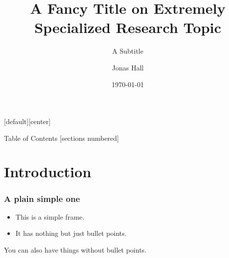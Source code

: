 \documentclass[10pt,xcolor=table]{beamer}
\title{A Fancy Title on Extremely Specialized Research Topic}
\subtitle{A Subtitle}
\date{\today}
\author{Jonas Hall}
\begin{document}
{
\maketitle
}

[default][center]

\begin{frame}[plain]{Table of Contents}
  [sections numbered]
  \tableofcontents[hideallsubsections]
\end{frame}

\section{Introduction}
\begin{frame}
  \frametitle{A plain simple one}
  \begin{itemize}
  \item This is a simple frame.
  \item It has nothing but just bullet points.
  \end{itemize}
  You can also have things without bullet points.
\end{frame}
\end{document}
